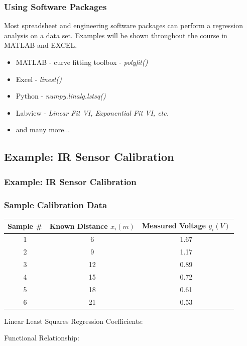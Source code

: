 \documentclass[fleqn]{beamer} %
\newcommand{\sectionIIIsubsectionIIItitle}{Using Software Packages}
\newcommand{\sectionIIIsubsectionIVtitle}{Example: IR Sensor Calibration}
\begin{document}
			\begin{frame}
				\frametitle{\sectionIIIsubsectionIIItitle}

		 Most spreadsheet and engineering software packages can perform a {\GR regression analysis} on a
data set. Examples will be shown throughout the course in MATLAB and EXCEL.\vspcc
	\begin{itemize}
	
	\item MATLAB - curve fitting toolbox - {\it polyfit()}
	\item Excel - {\it linest()}
	\item Python - {\it numpy.linalg.lstsq() }
	\item Labview - {\it Linear Fit VI, Exponential Fit VI, etc.}
	\item and many more...
	
	\end{itemize}
		

			\end{frame}

		
		\subsection{\sectionIIIsubsectionIVtitle}\label{sectionIIIsubsectionIV}	

			\begin{frame}
				\frametitle{\sectionIIIsubsectionIVtitle}

\frametitle{Sample Calibration Data}

\begin{tabular}{|c|c|c|}\hline
Sample \# & Known Distance $x_i (m)$ & Measured Voltage $y_i (V)$ \\ \hline \hline
1&6	&1.67 \\ \hline
2&9	&1.17 \\ \hline
3&12&0.89 \\ \hline
4&15&0.72 \\ \hline
5&18&0.61 \\ \hline
6&21&0.53 \\ \hline
\end{tabular}

\vspace{5mm}
Linear Least Squares Regression Coefficients: 
 \vspc

Functional Relationship: \\

			\end{frame}
\end{document}
